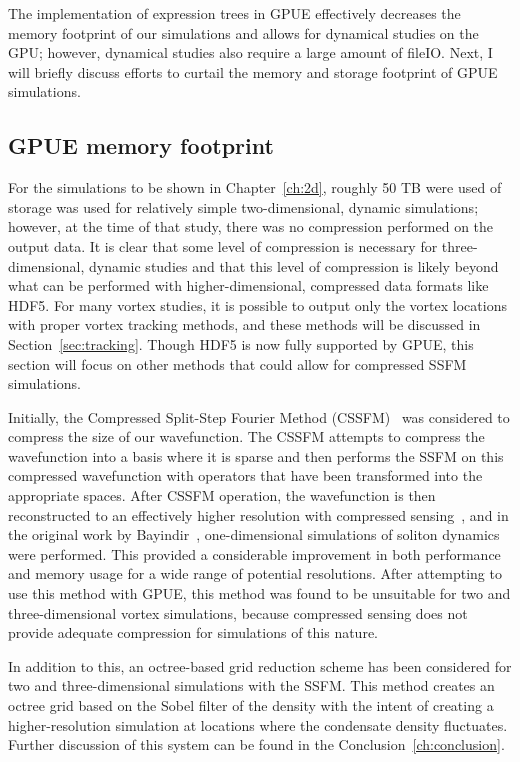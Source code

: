 The implementation of expression trees in GPUE effectively decreases the memory footprint of our simulations and allows for dynamical studies on the GPU; however, dynamical studies also require a large amount of fileIO.
Next, I will briefly discuss efforts to curtail the memory and storage footprint of GPUE simulations.

\subsection{GPUE memory footprint}

For the simulations to be shown in Chapter~\ref{ch:2d}, roughly 50 TB were used of storage was used for relatively simple two-dimensional, dynamic simulations; however, at the time of that study, there was no compression performed on the output data.
It is clear that some level of compression is necessary for three-dimensional, dynamic studies and that this level of compression is likely beyond what can be performed with higher-dimensional, compressed data formats like HDF5.
For many vortex studies, it is possible to output only the vortex locations with proper vortex tracking methods, and these methods will be discussed in Section~\ref{sec:tracking}.
Though HDF5 is now fully supported by GPUE, this section will focus on other methods that could allow for compressed SSFM simulations.

Initially, the Compressed Split-Step Fourier Method (CSSFM)~\cite{bayindir2015} was considered to compress the size of our wavefunction.
The CSSFM attempts to compress the wavefunction into a basis where it is sparse and then performs the SSFM on this compressed wavefunction with operators that have been transformed into the appropriate spaces.
After CSSFM operation, the wavefunction is then reconstructed to an effectively higher resolution with compressed sensing~\cite{davenport2012}, and 
in the original work by Bayindir~\cite{bayindir2015}, one-dimensional simulations of soliton dynamics were performed.
This provided a considerable improvement in both performance and memory usage for a wide range of potential resolutions.
After attempting to use this method with GPUE, this method was found to be unsuitable for two and three-dimensional vortex simulations, because compressed sensing does not provide adequate compression for simulations of this nature.

In addition to this, an octree-based grid reduction scheme has been considered for two and three-dimensional simulations with the SSFM.
This method creates an octree grid based on the Sobel filter of the density with the intent of creating a higher-resolution simulation at locations where the condensate density fluctuates.
Further discussion of this system can be found in the Conclusion~\ref{ch:conclusion}.

